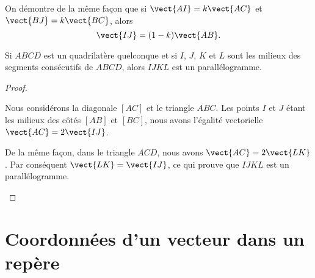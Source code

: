 On démontre de la même façon que si \( \vect{ AI }=k\vect{ AC }\) et \( \vect{ BJ }=k\vect{ BC }\), alors
\begin{equation}
    \vect{ IJ }=(1-k)\vect{ AB }.
\end{equation}

\begin{propriete}
    Si \( ABCD\) est un quadrilatère quelconque et si \( I\), \( J\), \( K\) et \( L\) sont les milieux des segments consécutifs de \( ABCD\), alors \( IJKL\) est un parallélogramme.
\end{propriete}

\begin{proof}

    \begin{multicols}{2}

        Nous considérons la diagonale \( [AC]\) et le triangle \( ABC\). Les points \( I\) et \( J\) étant les milieux des côtés \( [AB]\) et \( [BC]\), nous avons l'égalité vectorielle \( \vect{ AC }=2\vect{ IJ }\).

    De la même façon, dans le triangle \( ACD\), nous avons \( \vect{ AC }=2\vect{ LK }\). Par conséquent \( \vect{ LK }=\vect{ IJ }\), ce qui prouve que \( IJKL\) est un parallélogramme.

        \columnbreak

   \begin{center}

   \end{center}

    \end{multicols}


\end{proof}
 
\section{Coordonnées d'un vecteur dans un repère}


